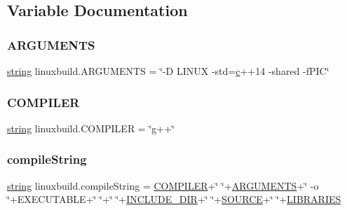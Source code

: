 \begin{DoxyCompactItemize}
\end{DoxyCompactItemize}


\subsection{Variable Documentation}
\mbox{\label{namespacelinuxbuild_aad9d75071db584a9ec8eff302b0b7b60}} 
\subsubsection{\texorpdfstring{ARGUMENTS}{ARGUMENTS}}
{\footnotesize\ttfamily \mbox{\hyperlink{asdl_8h_ae84541b4f3d8e1ea24ec0f466a8c568b}{string}} linuxbuild.\+A\+R\+G\+U\+M\+E\+N\+TS = \char`\"{}-\/D L\+I\+N\+UX -\/std=\mbox{\hyperlink{_s_d_l__opengl__glext_8h_a1f2d7f8147412c43ba2303a56f97ee73}{c}}++14 -\/shared -\/f\+P\+IC\char`\"{}}

\mbox{\label{namespacelinuxbuild_a67565370a9a5bc2e652adc90570ae1d9}} 
\subsubsection{\texorpdfstring{COMPILER}{COMPILER}}
{\footnotesize\ttfamily \mbox{\hyperlink{asdl_8h_ae84541b4f3d8e1ea24ec0f466a8c568b}{string}} linuxbuild.\+C\+O\+M\+P\+I\+L\+ER = \char`\"{}g++\char`\"{}}

\mbox{\label{namespacelinuxbuild_abd62d69edb0813f34ae7197ae2d4a4ad}} 
\subsubsection{\texorpdfstring{compileString}{compileString}}
{\footnotesize\ttfamily \mbox{\hyperlink{asdl_8h_ae84541b4f3d8e1ea24ec0f466a8c568b}{string}} linuxbuild.\+compile\+String = \mbox{\hyperlink{namespacelinuxbuild_a67565370a9a5bc2e652adc90570ae1d9}{C\+O\+M\+P\+I\+L\+ER}}+\char`\"{} \char`\"{}+\mbox{\hyperlink{namespacelinuxbuild_aad9d75071db584a9ec8eff302b0b7b60}{A\+R\+G\+U\+M\+E\+N\+TS}}+\char`\"{} -\/o \char`\"{}+E\+X\+E\+C\+U\+T\+A\+B\+LE+\char`\"{} \char`\"{}+\char`\"{} \char`\"{}+\mbox{\hyperlink{namespacelinuxbuild_a5043360151bd876c9aa7bcd6bff4dc5d}{I\+N\+C\+L\+U\+D\+E\+\_\+\+D\+IR}}+\char`\"{} \char`\"{}+\mbox{\hyperlink{namespacelinuxbuild_a9a51ab9159bdd85160ff7debd98e8bf1}{S\+O\+U\+R\+CE}}+\char`\"{} \char`\"{}+\mbox{\hyperlink{namespacelinuxbuild_a8d8b6325ef25fe198a192c9b2f32a3c4}{L\+I\+B\+R\+A\+R\+I\+ES}}}

